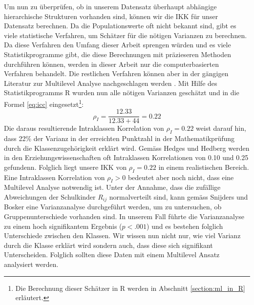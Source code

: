 \documentclass[12pt]{article}\usepackage[]{graphicx}\usepackage[]{color}
\numberwithin{equation}{section}
\begin{document}
Um nun zu überprüfen, ob in unserem Datensatz überhaupt abhängige hierarchische Strukturen vorhanden sind, können wir die IKK für unser Datensatz berechnen. Da die Populationswerte oft nicht bekannt sind, gibt es viele statistische Verfahren, um Schätzer für die nötigen Varianzen zu berechnen. Da diese Verfahren den Umfang dieser Arbeit sprengen würden und es viele Statistikprogramme gibt, die diese Berechnungen mit präzieseren Methoden durchführen können, werden in dieser Arbeit nur die computerbasierten Verfahren behandelt. Die restlichen Verfahren können aber in der gängigen Literatur zur Multilevel Analyse nachgeschlagen werden \citep[z.B.][]{SnijdersTomA.B2012Ma:a}. Mit Hilfe des Statistikprogramms R wurden nun alle nötigen Varianzen geschätzt und in die Formel \eqref{eq:icc} eingesetzt\footnote{Die Berechnung dieser Schätzer in R werden in Abschnitt \ref{section:ml_in_R} erläutert.}:
\begin{equation} \label{eq:icc_calc}
\rho_{I} = \dfrac{12.33}{12.33 + 44} = 0.22
\end{equation}
Die daraus resultierende Intraklassen Korrelation von $\rho_{I} = 0.22$ weist darauf hin, dass 22\% der Varianz in der erreichten Punktzahl in der Mathematikprüfung durch die Klassenzugehörigkeit erklärt wird. Gemäss Hedges und Hedberg \citeyearpar{hedges&hedberg:2007} werden in den Erziehungswissenschaften oft Intraklassen Korrelationen von 0.10 und 0.25 gefundenn. Folglich liegt unsere IKK von $\rho_{I} = 0.22$ in einem realistischen Bereich. Eine Intraklassen Korrelation von $\rho_{I} > 0$ bedeutet aber noch nicht, dass eine Multilevel Analyse notwendig ist. Unter der Annahme, dass die zufällige Abweichungen der Schulkinder $R_{ij}$ normalverteilt sind, kann gemäss Snijders und Bosker \citeyearpar{SnijdersTomA.B2012Ma:a} eine Varianzanalyse durchgeführt werden, um zu untersuchen, ob Gruppenunterschiede vorhanden sind. In unserem Fall führte die Varianzanalyse zu einem hoch signifikantem Ergebnis ($p<.001$) und es bestehen folglich Unterschiede zwischen den Klassen. Wir wissen nun nicht nur, wie viel Varianz durch die Klasse erklärt wird sondern auch, dass diese sich signifikant Unterscheiden. Folglich sollten diese Daten mit einem Multilevel Ansatz analysiert werden.
\end{document}
